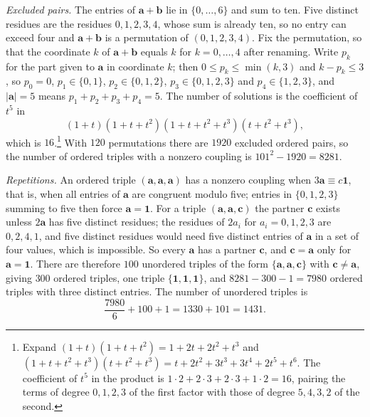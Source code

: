 \documentclass[11pt]{amsart}
\theoremstyle{definition}
\theoremstyle{remark}
\newcommand{\bb}{\mathbf{b}}
\newcommand{\cc}{\mathbf{c}}
\newcommand{\va}{\mathbf{a}}
\newcommand{\one}{\mathbf{1}}
\begin{document}
\emph{Excluded pairs.} The entries of $\va+\bb$ lie in $\{0,\dots,6\}$ and
sum to ten. Five distinct residues are the residues $0,1,2,3,4$, whose sum
is already ten, so no entry can exceed four and $\va+\bb$ is a permutation
of $(0,1,2,3,4)$. Fix the permutation, so that the coordinate $k$ of
$\va+\bb$ equals $k$ for $k=0,\dots,4$ after renaming. Write $p_k$ for the
part given to $\va$ in coordinate $k$; then $0\le p_k\le\min(k,3)$ and
$k-p_k\le3$, so $p_0=0$, $p_1\in\{0,1\}$, $p_2\in\{0,1,2\}$,
$p_3\in\{0,1,2,3\}$ and $p_4\in\{1,2,3\}$, and $|\va|=5$ means
$p_1+p_2+p_3+p_4=5$. The number of solutions is the coefficient of $t^5$ in
\[
(1+t)(1+t+t^2)(1+t+t^2+t^3)(t+t^2+t^3),
\]
which is $16$.\footnote{Expand $(1+t)(1+t+t^2)=1+2t+2t^2+t^3$ and
$(1+t+t^2+t^3)(t+t^2+t^3)=t+2t^2+3t^3+3t^4+2t^5+t^6$. The coefficient of
$t^5$ in the product is $1\cdot2+2\cdot3+2\cdot3+1\cdot2=16$, pairing the
terms of degree $0,1,2,3$ of the first factor with those of degree
$5,4,3,2$ of the second.} With $120$ permutations there are $1920$
excluded ordered pairs, so the number of ordered triples with a nonzero
coupling is $101^2-1920=8281$.

\emph{Repetitions.} An ordered triple $(\va,\va,\va)$ has a nonzero coupling
when $3\va\equiv c\one$, that is, when all entries of $\va$ are congruent
modulo five; entries in $\{0,1,2,3\}$ summing to five then force
$\va=\one$. For a triple $(\va,\va,\cc)$ the partner $\cc$ exists unless
$2\va$ has five distinct residues; the residues of $2a_i$ for
$a_i=0,1,2,3$ are $0,2,4,1$, and five distinct residues would need five
distinct entries of $\va$ in a set of four values, which is impossible. So
every $\va$ has a partner $\cc$, and $\cc=\va$ only for $\va=\one$. There
are therefore $100$ unordered triples of the form $\{\va,\va,\cc\}$ with
$\cc\ne\va$, giving $300$ ordered triples, one triple $\{\one,\one,\one\}$,
and $8281-300-1=7980$ ordered triples with three distinct entries. The
number of unordered triples is
\[
\frac{7980}{6}+100+1=1330+101=1431.
\]
\end{document}
